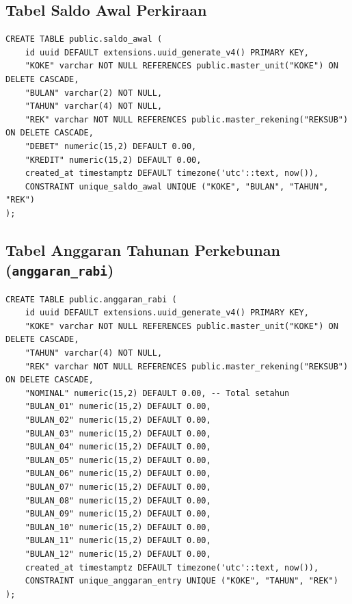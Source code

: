 \documentclass[11pt,a4paper]{article}
\begin{document}
\subsection{Tabel Saldo Awal Perkiraan}
\begin{lstlisting}[caption={DDL Saldo Awal}]
CREATE TABLE public.saldo_awal (
    id uuid DEFAULT extensions.uuid_generate_v4() PRIMARY KEY,
    "KOKE" varchar NOT NULL REFERENCES public.master_unit("KOKE") ON DELETE CASCADE,
    "BULAN" varchar(2) NOT NULL,
    "TAHUN" varchar(4) NOT NULL,
    "REK" varchar NOT NULL REFERENCES public.master_rekening("REKSUB") ON DELETE CASCADE,
    "DEBET" numeric(15,2) DEFAULT 0.00,
    "KREDIT" numeric(15,2) DEFAULT 0.00,
    created_at timestamptz DEFAULT timezone('utc'::text, now()),
    CONSTRAINT unique_saldo_awal UNIQUE ("KOKE", "BULAN", "TAHUN", "REK")
);
\end{lstlisting}

\subsection{Tabel Anggaran Tahunan Perkebunan (\texttt{anggaran\_rabi})}
\begin{lstlisting}[caption={DDL Anggaran Perkebunan}]
CREATE TABLE public.anggaran_rabi (
    id uuid DEFAULT extensions.uuid_generate_v4() PRIMARY KEY,
    "KOKE" varchar NOT NULL REFERENCES public.master_unit("KOKE") ON DELETE CASCADE,
    "TAHUN" varchar(4) NOT NULL,
    "REK" varchar NOT NULL REFERENCES public.master_rekening("REKSUB") ON DELETE CASCADE,
    "NOMINAL" numeric(15,2) DEFAULT 0.00, -- Total setahun
    "BULAN_01" numeric(15,2) DEFAULT 0.00,
    "BULAN_02" numeric(15,2) DEFAULT 0.00,
    "BULAN_03" numeric(15,2) DEFAULT 0.00,
    "BULAN_04" numeric(15,2) DEFAULT 0.00,
    "BULAN_05" numeric(15,2) DEFAULT 0.00,
    "BULAN_06" numeric(15,2) DEFAULT 0.00,
    "BULAN_07" numeric(15,2) DEFAULT 0.00,
    "BULAN_08" numeric(15,2) DEFAULT 0.00,
    "BULAN_09" numeric(15,2) DEFAULT 0.00,
    "BULAN_10" numeric(15,2) DEFAULT 0.00,
    "BULAN_11" numeric(15,2) DEFAULT 0.00,
    "BULAN_12" numeric(15,2) DEFAULT 0.00,
    created_at timestamptz DEFAULT timezone('utc'::text, now()),
    CONSTRAINT unique_anggaran_entry UNIQUE ("KOKE", "TAHUN", "REK")
);
\end{lstlisting}
\end{document}
